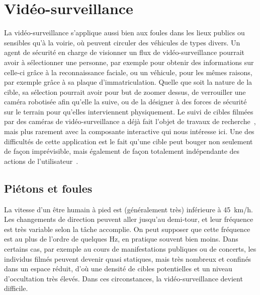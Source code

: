 	\section{Vidéo-surveillance}
	La vidéo-surveillance s'applique aussi bien aux foules dans les lieux publics ou sensibles qu'à la voirie, où peuvent circuler des véhicules de types divers. Un agent de sécurité en charge de visionner un flux de vidéo-surveillance pourrait avoir à sélectionner une personne, par exemple pour obtenir des informations sur celle-ci grâce à la reconnaissance faciale, ou un véhicule, pour les mêmes raisons, par exemple grâce à sa plaque d'immatriculation. Quelle que soit la nature de la cible, sa sélection pourrait avoir pour but de zoomer dessus, de verrouiller une caméra robotisée afin qu'elle la suive, ou de la désigner à des forces de sécurité sur le terrain pour qu'elles interviennent physiquement. Le suivi de cibles filmées par des caméras de vidéo-surveillance a déjà fait l'objet de travaux de recherche~\cite{lipton1998moving, nishimura1997video, benfold2011stable}, mais plus rarement avec la composante interactive qui nous intéresse ici. Une des difficultés de cette application est le fait qu'une cible peut bouger non seulement de façon imprévisible, mais également de façon totalement indépendante des actions de l'utilisateur~\cite{ilich2010moving, silva2012real}.	
	
	\subsection{Piétons et foules}
	La vitesse d'un être humain à pied est (généralement très) inférieure à 45~km/h. Les changements de direction peuvent aller jusqu'au demi-tour, et leur fréquence est très variable selon la tâche accomplie. On peut supposer que cette fréquence est au plus de l'ordre de quelques Hz, en pratique souvent bien moins. Dans certains cas, par exemple au cours de manifestations publiques ou de concerts, les individus filmés peuvent devenir quasi statiques, mais très nombreux et confinés dans un espace réduit, d'où une densité de cibles potentielles et un niveau d'occultation très élevés. Dans ces circonstances, la vidéo-surveillance devient difficile.

